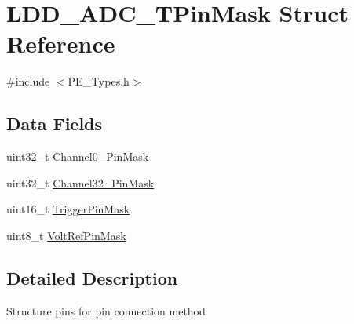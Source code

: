 \hypertarget{struct_l_d_d___a_d_c___t_pin_mask}{\section{L\-D\-D\-\_\-\-A\-D\-C\-\_\-\-T\-Pin\-Mask Struct Reference}
\label{struct_l_d_d___a_d_c___t_pin_mask}
}


{\ttfamily \#include $<$P\-E\-\_\-\-Types.\-h$>$}

\subsection*{Data Fields}
\begin{DoxyCompactItemize}
\item 
uint32\-\_\-t \hyperlink{struct_l_d_d___a_d_c___t_pin_mask_a66d94f79f603c74c93540553a49bbf3f}{Channel0\-\_\-Pin\-Mask}
\item 
uint32\-\_\-t \hyperlink{struct_l_d_d___a_d_c___t_pin_mask_acd6bf6f512fb6e8cd170188dc663a4d8}{Channel32\-\_\-Pin\-Mask}
\item 
uint16\-\_\-t \hyperlink{struct_l_d_d___a_d_c___t_pin_mask_a004a4d3a4f4071684e6676f64322215f}{Trigger\-Pin\-Mask}
\item 
uint8\-\_\-t \hyperlink{struct_l_d_d___a_d_c___t_pin_mask_a556430a91304e7db634bda25091b892c}{Volt\-Ref\-Pin\-Mask}
\end{DoxyCompactItemize}


\subsection{Detailed Description}
Structure pins for pin connection method 

